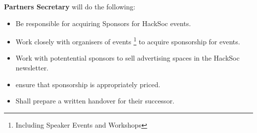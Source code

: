 \begin{subclause}
	\textbf{Partners Secretary} will do the following:
	\begin{itemize}[label=--]
		\item Be responsible for acquiring Sponsors for HackSoc events.
		\item Work closely with organisers of events \footnote{Including Speaker Events and Workshops} to acquire sponsorship for events.
		\item Work with potentential sponsors to sell advertising spaces in the HackSoc newsletter.
		\item ensure that sponsorship is appropriately priced.
		\item Shall prepare a written handover for their successor.
	\end{itemize}
\end{subclause}

